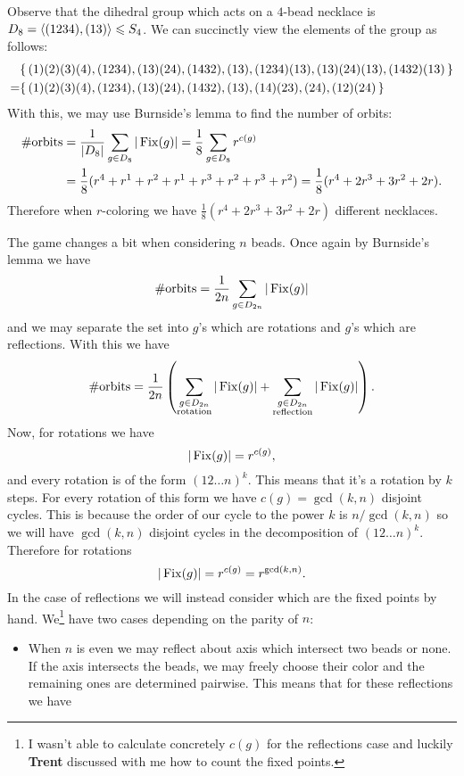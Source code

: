\documentclass[12pt]{memoir}
\begin{document}
\begin{ptcbr}
 Observe that the dihedral group which acts on a $4$-bead necklace is $D_8=\left\langle (1234),(13)\right\rangle\leqslant S_4$. We can succinctly view the elements of the group as follows:
        \begin{align*}
            &\{\,(1)(2)(3)(4),(1234),(13)(24),(1432),(13),(1234)(13),(13)(24)(13),(1432)(13)\,\}\\
            =&\{\,(1)(2)(3)(4),(1234),(13)(24),(1432),(13),(14)(23),(24),(12)(24)\,\}
        \end{align*}
        With this, we may use Burnside's lemma to find the number of orbits:
        \begin{align*}
        \#\text{orbits}&=\frac{1}{|D_8|}\sum_{g\in D_{8}}|\operatorname{Fix}(g)|=\frac{1}{8}\sum_{g\in D_{8}}r^{c(g)}\\
        &=\frac{1}{8}(r^4+r^1+r^2+r^1+r^3+r^2+r^3+r^2)
        =\frac{1}{8}(r^4+2r^3+3r^2+2r).
        \end{align*}
Therefore when $r$-coloring we have $\frac{1}{8}(r^4+2r^3+3r^2+2r)$ different necklaces.\par 
The game changes a bit when considering $n$ beads. Once again by Burnside's lemma we have 
$$\#\text{orbits}=\frac{1}{2n}\sum_{g\in D_{2n}}|\operatorname{Fix}(g)|$$
and we may separate the set into $g$'s which are rotations and $g$'s which are reflections. With this we have 
$$\#\text{orbits}=\frac{1}{2n}\left(\sum_{\substack{g\in D_{2n}\\\text{rotation}}}|\operatorname{Fix}(g)|+\sum_{\substack{g\in D_{2n}\\\text{reflection}}}|\operatorname{Fix}(g)|\right).$$
Now, for rotations we have 
$$|\operatorname{Fix}(g)|=r^{c(g)},$$
and every rotation is of the form $(12\dots n)^k$. This means that it's a rotation by $k$ steps. For every rotation of this form we have $c(g)=\gcd(k,n)$ disjoint cycles. This is because the order of our cycle to the power $k$ is $n/\gcd(k,n)$ so we will have $\gcd(k,n)$ disjoint cycles in the decomposition of $(12\dots n)^k$. Therefore for rotations 
$$|\operatorname{Fix}(g)|=r^{c(g)}=r^{\gcd(k,n)}.$$
In the case of reflections we will instead consider which are the fixed points by hand. We\footnote{I wasn't able to calculate concretely $c(g)$ for the reflections case and luckily \textbf{Trent} discussed with me how to count the fixed points.} have two cases depending on the parity of $n$:
\begin{itemize}
    \itemsep=-0.4em 
    \item When $n$ is even we may reflect about axis which intersect two beads or none. If the axis intersects the beads, we may freely choose their color and the remaining ones are determined pairwise. This means that for these reflections we have 

\end{itemize}
\end{ptcbr}
\end{document}
